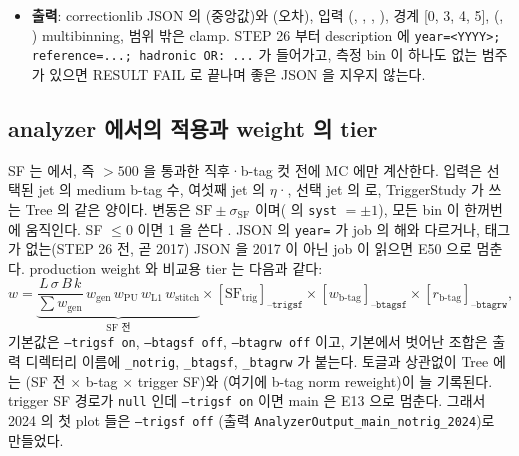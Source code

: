\begin{itemize}
  값으로 채우고(2D log-quadratic fit 은 선택), 상대 오차는 측정 bin 의 중앙값과 5\,\% 중 큰 것 이상, 못 채우면 SF $=1\pm0.5$ 이다
  .
\item \textbf{출력}: correctionlib JSON  의 (중앙값)와 (오차), 입력
  (, , , ),  경계 [0, 3, 4, 5], (\HT, \pt) multibinning, 범위 밖은 clamp. STEP 26 부터
  description 에 \texttt{year=<YYYY>; reference=...; hadronic OR: ...} 가 들어가고, 측정 bin 이 하나도 없는 범주가 있으면 RESULT FAIL 로
  끝나며 좋은 JSON 을 지우지 않는다\tagimpl.
\end{itemize}

\subsection{analyzer 에서의 적용과 weight 의 tier}\label{sec:trigger-apply}

SF 는  에서, 즉 \HT{} $>500$ 을 통과한 직후·b-tag 컷 전에 MC 에만 계산한다. 입력은 선택된 jet 의 medium
b-tag 수, 여섯째 jet 의 $\eta$·\pt, 선택 jet 의 \HT{} 로, TriggerStudy 가 쓰는 Tree 의 같은 양이다. 변동은 $\mathrm{SF}\pm\sigma_\mathrm{SF}$
이며( 의 \texttt{syst} $=\pm1$), 모든 bin 이 한꺼번에 움직인다. SF $\leq 0$ 이면 1 을 쓴다
\tagimpl. JSON 의 \texttt{year=} 가 job 의 해와
다르거나, 태그가 없는(STEP 26 전, 곧 2017) JSON 을 2017 이 아닌 job 이 읽으면 E50 으로 멈춘다.
production weight 와 비교용 tier 는 다음과 같다:
\begin{equation}
  w = \underbrace{\frac{L\,\sigma\,B\,k}{\sum w_\text{gen}}\, w_\text{gen}\, w_\text{PU}\, w_\text{L1}\, w_\text{stitch}}_{\text{SF 전}}
  \times [\mathrm{SF}_\text{trig}]_\texttt{--trigsf} \times [w_\text{b-tag}]_\texttt{--btagsf} \times [r_\text{b-tag}]_\texttt{--btagrw},
  \label{eq:trigger-weight}
\end{equation}
기본값은 \texttt{--trigsf on}, \texttt{--btagsf off}, \texttt{--btagrw off} 이고, 기본에서 벗어난 조합은 출력 디렉터리 이름에
\texttt{\_notrig}, \texttt{\_btagsf}, \texttt{\_btagrw} 가 붙는다. 토글과 상관없이 Tree 에는 (SF 전 $\times$ b-tag
$\times$ trigger SF)와 (여기에 b-tag norm reweight)이 늘 기록된다. trigger SF 경로가 \texttt{null} 인데
\texttt{--trigsf on} 이면 main 은 E13 으로 멈춘다. 그래서 2024 의 첫 plot 들은 \texttt{--trigsf off}
(출력 \texttt{AnalyzerOutput\_main\_notrig\_2024})로 만들었다.

